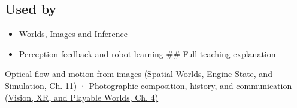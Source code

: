 \subsection{Used by}\label{appendix-e2e73f8cd93e-used-by}

\hypertarget{appendix-e2e73f8cd93e-used-by}{}

\begin{itemize}
\item
  {Worlds, Images and Inference}
\item
  \hyperref[appendix-b0c42da325f1]{Perception feedback and robot learning} \#\# Full teaching explanation
\end{itemize}

\href{../05-Spatial-Worlds-Engine-State-and-Simulation/main.pdf\#nameddest=04-visual-computing-ii-ch030-optical-flow-and-motion-from-images}{Optical flow and motion from images (Spatial Worlds, Engine State, and Simulation, Ch. 11)} · \href{../07-Vision-XR-and-Playable-Worlds/main.pdf\#nameddest=04-visual-computing-ii-ch034-photographic-composition-history-and-communication}{Photographic composition, history, and communication (Vision, XR, and Playable Worlds, Ch. 4)}
